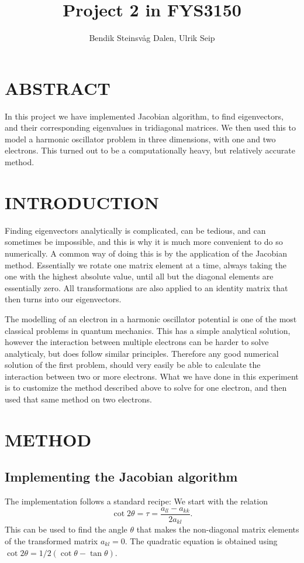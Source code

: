 \documentclass[a4paper]{article}
\title{Project 2 in FYS3150}
\author{Bendik Steinsvåg Dalen, Ulrik Seip}
\begin{document}
\maketitle

\section{ABSTRACT}

In this project we have implemented Jacobian algorithm, to find eigenvectors, and their corresponding eigenvalues in tridiagonal matrices. We then used this to model a harmonic oscillator problem in three dimensions, with one and two electrons. This turned out to be a computationally heavy, but relatively accurate method.

\section{INTRODUCTION}

Finding eigenvectors analytically is complicated, can be tedious, and can sometimes be impossible, and this is why it is much more convenient to do so numerically. A common way of doing this is by the application of the Jacobian method. Essentially we rotate one matrix element at a time, always taking the one with the highest absolute value, until all but the diagonal elements are essentially zero. All transformations are also applied to an identity matrix that then turns into our eigenvectors. 

The modelling of an electron in a harmonic oscillator potential is one of the most classical problems in quantum mechanics. This has a simple analytical solution, however the interaction between multiple electrons can be harder to solve analyticaly, but does follow similar principles. Therefore any good numerical solution of the first problem, should very easily be able to calculate the interaction between two or more electrons. What we have done in this experiment is to customize the method described above to solve for one electron, and then used that same method on two electrons. 

\section{METHOD}

\subsection{Implementing the Jacobian algorithm}
The implementation follows a standard recipe:
We start with the relation
\begin{equation*}\cot 2\theta=\tau = \frac{a_{ll}-a_{kk}}{2a_{kl}}.
\end{equation*}
This can be used to find the angle $\theta$ that makes the  non-diagonal matrix elements of the transformed matrix 
$a_{kl} = 0$. The quadratic equation is obtained using $\cot 2\theta=1/2(\cot\theta-\tan\theta)$.
\end{document}
